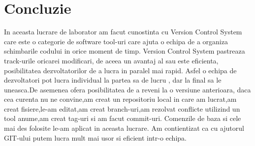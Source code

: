 \section{Concluzie}
\tab In aceasta lucrare de laborator am facut cunostinta cu Version Control System care este o categorie de software tool-uri care ajuta o echipa de a organiza schimbarile codului in orice moment de timp. Version Control System pastreaza track-urile oricarei modificari, de aceea un avantaj al sau este eficienta, posibilitatea dezvoltatorilor de a lucra in paralel mai rapid. Asfel o echipa de dezvoltatori pot lucra individual la partea sa de lucru , dar la final sa le uneasca.De asemenea ofera posibilitatea de a reveni la o versiune anterioara, daca cea curenta nu ne convine,am creat un repositoriu local in care am lucrat,am creat fisiere,le-am editat,am creat branch-uri,am rezolvat conflicte utilizind un tool anume,am creat tag-uri si am facut commit-uri. Comenzile de baza si cele mai des folosite le-am aplicat in aceasta lucrare. 
\tab Am contientizat ca cu ajutorul GIT-ului putem lucra mult mai usor si eficient intr-o echipa.